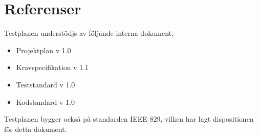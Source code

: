 \section{Referenser}
 
Testplanen understödjs av följande interna dokument;

\begin{itemize}
\item Projektplan v 1.0
\item Kravspecifikation v 1.1
\item Teststandard v 1.0
\item Kodstandard v 1.0	
\end{itemize}
Testplanen bygger också på standarden IEEE 829\cite{ieee829}, vilken har lagt dispositionen för detta dokument.
